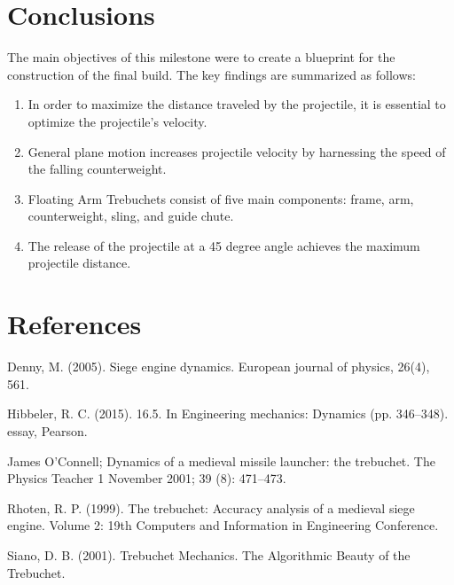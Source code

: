 \documentclass[12pt, titlepage]{article}
\begin{document}
    \newpage
    \section{Conclusions}
    The main objectives of this milestone were to create a blueprint for 
    the construction of the final build.
    The key findings are summarized as follows:
    \begin{enumerate}
        \item In order to maximize the distance traveled by the projectile, it is essential to optimize the projectile's velocity. 
        \item General plane motion increases projectile velocity by harnessing the speed of the falling counterweight.    
        \item Floating Arm Trebuchets consist of five main components: 
            frame, arm, counterweight, sling, and guide chute.
        \item The release of the projectile at a 45 degree angle achieves the 
            maximum projectile distance.
    \end{enumerate}
    \newpage
    \section{References}
        \hspace{15pt}Denny, M. (2005). Siege engine dynamics. European journal of physics, 26(4), 561.

        Hibbeler, R. C. (2015). 16.5. In Engineering mechanics: Dynamics (pp. 346–348). essay, Pearson.
        
        James O'Connell; Dynamics of a medieval missile launcher: the trebuchet. The Physics Teacher 1 November 2001; 39 (8): 471–473.

        Rhoten, R. P. (1999). The trebuchet: Accuracy analysis of a medieval siege engine. Volume 2: 19th Computers and Information in Engineering Conference.

        Siano, D. B. (2001). Trebuchet Mechanics. The Algorithmic Beauty of the Trebuchet.
\end{document}
